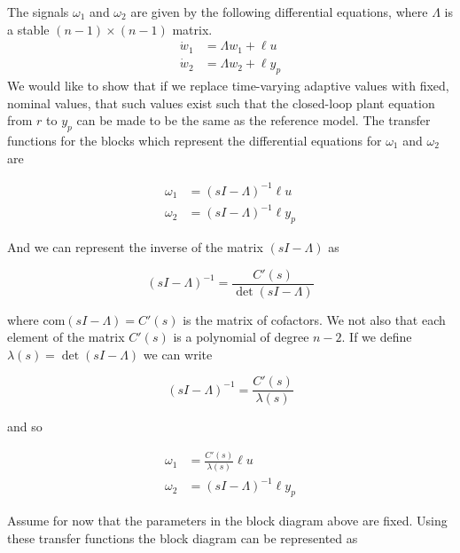 The signals $\omega_{1}$ and $\omega_{2}$ are given by the following differential equations, where $\Lambda$ is a stable $(n-1)\times(n-1)$ matrix.
\begin{align*}
  \dot{w}_{1}&=\Lambda w_{1}+\ell u \\
  \dot{w}_{2}&=\Lambda w_{2}+\ell y_{p}
\end{align*}
We would like to show that if we replace time-varying adaptive values with fixed, nominal values, that such values exist such that the closed-loop plant equation from $r$ to $y_{p}$ can be made to be the same as the reference model.
The transfer functions for the blocks which represent the differential equations for $\omega_{1}$ and $\omega_{2}$ are

\begin{align*}
  \omega_{1}&=(sI-\Lambda)^{-1}\ell u \\
  \omega_{2}&=(sI-\Lambda)^{-1}\ell y_{p}
\end{align*}

And we can represent the inverse of the matrix $(sI-\Lambda)$ as

\begin{equation*}
  (sI-\Lambda)^{-1}=\frac{C'(s)}{\det(sI-\Lambda)}
\end{equation*}

where $\text{com}(sI-\Lambda)=C'(s)$ is the matrix of cofactors.
We not also that each element of the matrix $C'(s)$ is a polynomial of degree $n-2$.
If we define $\lambda(s)=\det(sI-\Lambda)$ we can write

\begin{equation*}
  (sI-\Lambda)^{-1}=\frac{C'(s)}{\lambda(s)}
\end{equation*}

and so

\begin{align*}
  \omega_{1}&=\frac{C'(s)}{\lambda(s)}\ell u \\
  \omega_{2}&=(sI-\Lambda)^{-1}\ell y_{p}
\end{align*}

Assume for now that the parameters in the block diagram above are fixed.
Using these transfer functions the block diagram can be represented as

